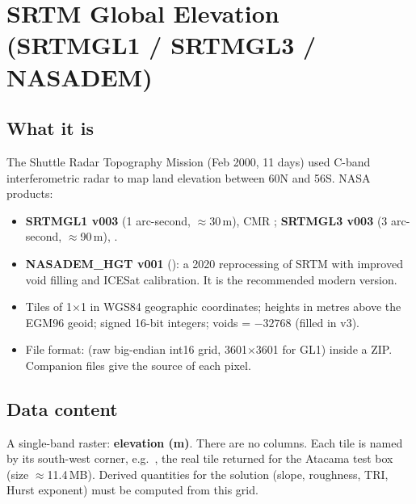 \documentclass[10pt,a4paper]{article}
\begin{document}
\section{SRTM Global Elevation (SRTMGL1 / SRTMGL3 / NASADEM)}
\subsection{What it is}
The Shuttle Radar Topography Mission (Feb 2000, 11 days) used C-band interferometric radar to map land elevation between 60\textdegree N and 56\textdegree S. NASA products:
\begin{itemize}
\item \textbf{SRTMGL1 v003} (1 arc-second, $\approx$30\,m), CMR ; \textbf{SRTMGL3 v003} (3 arc-second, $\approx$90\,m), .
\item \textbf{NASADEM\_HGT v001} (): a 2020 reprocessing of SRTM with improved void filling and ICESat calibration. It is the recommended modern version.
\item Tiles of 1\textdegree{}$\times$1\textdegree{} in WGS84 geographic coordinates; heights in metres above the EGM96 geoid; signed 16-bit integers; voids = $-32768$ (filled in v3).
\item File format:  (raw big-endian int16 grid, 3601$\times$3601 for GL1) inside a ZIP. Companion  files give the source of each pixel.
\end{itemize}

\subsection{Data content}
A single-band raster: \textbf{elevation (m)}. There are no columns. Each tile is named by its south-west corner, e.g.\ , the real tile returned for the Atacama test box (size $\approx$11.4\,MB). Derived quantities for the solution (slope, roughness, TRI, Hurst exponent) must be computed from this grid.
\end{document}
